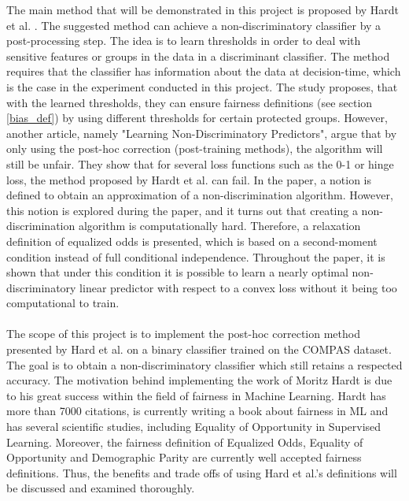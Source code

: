 \documentclass[11pt, fleqn, titlepage]{article}
\begin{document}
	\noindent The main method that will be demonstrated in this project is proposed by Hardt et al. \cite{equal_of_oppor}. The suggested method can achieve a non-discriminatory classifier by a post-processing step. The idea is to learn thresholds in order to deal with sensitive features or groups in the data in a discriminant classifier. The method requires that the classifier has information about the data at decision-time, which is the case in the experiment conducted in this project. The study proposes, that with the learned thresholds, they can ensure fairness definitions (see section \ref{bias_def}) by using different thresholds for certain protected groups. However, another article, namely "Learning Non-Discriminatory Predictors", argue that by only using the post-hoc correction (post-training methods), the algorithm will still be unfair. \cite{b_woodworth} They show that for several loss functions such as the 0-1 or hinge loss, the method proposed by Hardt et al. \cite{equal_of_oppor} can fail. In the paper, a notion is defined to obtain an approximation of a non-discrimination algorithm. However, this notion is explored during the paper, and it turns out that creating a non-discrimination algorithm is computationally hard. Therefore, a relaxation definition of equalized odds is presented, which is based on a second-moment condition instead of full conditional independence. Throughout the paper, it is shown that under this condition it is possible to learn a nearly optimal non-discriminatory linear predictor with respect to a convex loss without it being too computational to train. \cite{b_woodworth}\\\\
	The scope of this project is to implement the post-hoc correction method presented by Hard et al. \cite{equal_of_oppor} on a binary classifier trained on the COMPAS dataset. The goal is to obtain a non-discriminatory classifier which still retains a respected accuracy. The motivation behind implementing the work of Moritz Hardt is due to his great success within the field of fairness in Machine Learning. Hardt has more than 7000 citations, is currently writing a book about fairness in ML and has several scientific studies, including Equality of Opportunity in Supervised Learning. Moreover, the fairness definition of Equalized Odds, Equality of Opportunity and Demographic Parity are currently well accepted fairness definitions. Thus, the benefits and trade offs of using Hard et al.'s definitions will be discussed and examined thoroughly.
	
\end{document}
